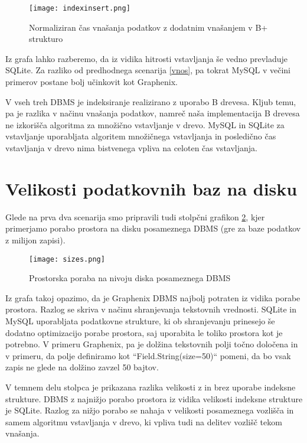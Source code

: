 \documentclass[a4paper,12pt,openright]{book}
\begin{document}
    \begin{figure}[H]
        \centerline{\texttt{[image: indexinsert.png]}}
        \caption{Normaliziran čas vnašanja podatkov z dodatnim vnašanjem v B+ strukturo}
        \label{index_vnos}
    \end{figure}

    \noindent
    Iz grafa lahko razberemo, da iz vidika hitrosti vstavljanja še vedno prevladuje SQLite. Za razliko od predhodnega scenarija \ref{vnos}, pa tokrat MySQL v večini primerov postane bolj učinkovit kot Graphenix.

    V vseh treh DBMS je indeksiranje realizirano z uporabo B drevesa. Kljub temu, pa je razlika v načinu vnašanja podatkov, namreč naša implementacija B drevesa ne izkorišča algoritma za množično vstavljanje v drevo. MySQL in SQLite za vstavljanje uporabljata algoritem množičnega vstavljanja in posledično čas vstavljanja v drevo nima bistvenega vpliva na celoten čas vstavljanja.
 
    \section{Velikosti podatkovnih baz na disku}
    \label{size_analysis}

    Glede na prva dva scenarija smo pripravili tudi stolpčni grafikon \ref{velikosti}, kjer primerjamo porabo prostora na disku posameznega DBMS (gre za baze podatkov z milijon zapisi). 
    
    \begin{figure}[H]
        \centerline{\texttt{[image: sizes.png]}}
        \caption{Prostorska poraba na nivoju diska posameznega DBMS}
        \label{velikosti}
    \end{figure}

    \noindent
    Iz grafa takoj opazimo, da je Graphenix DBMS najbolj potraten iz vidika porabe prostora. Razlog se skriva v načinu shranjevanja tekstovnih vrednosti. SQLite in MySQL uporabljata podatkovne strukture, ki ob shranjevanju prinesejo še dodatno optimizacijo porabe prostora, saj uporabita le toliko prostora kot je potrebno. V primeru Graphenix, pa je dolžina tekstovnih polji točno določena in v primeru, da polje definiramo kot ``Field.String(size=50)`` pomeni, da bo vsak zapis ne glede na dolžino zavzel 50 bajtov.

    V temnem delu stolpca je prikazana razlika velikosti z in brez uporabe indeksne strukture. DBMS z najnižjo porabo prostora iz vidika velikosti indeksne strukture je SQLite. Razlog za nižjo porabo se nahaja v velikosti posameznega vozlišča in samem algoritmu vstavljanja v drevo, ki vpliva tudi na delitev vozlišč tekom vnašanja.
\end{document}
